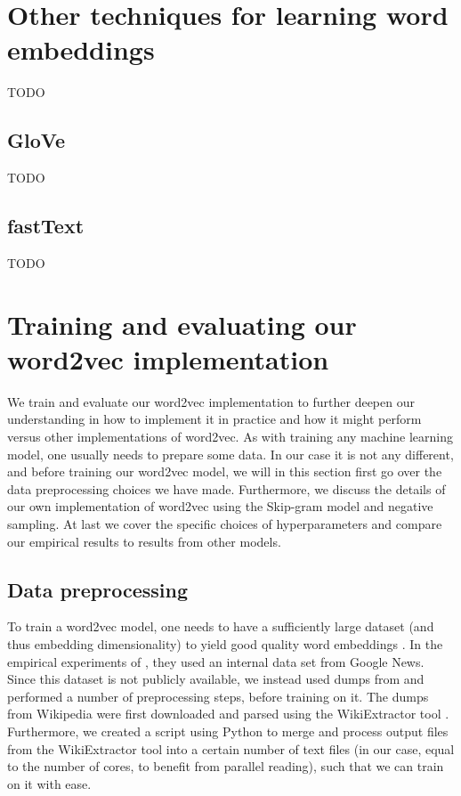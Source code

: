 \section{Other techniques for learning word embeddings}
TODO

\subsection{GloVe}
TODO

\subsection{fastText}
TODO

\section{Training and evaluating our word2vec implementation}
\label{sec:training-and-eval-our-word2vec-impl}
We train and evaluate our word2vec implementation to further deepen our understanding in how to implement it in practice and how it might perform versus other implementations of word2vec. As with training any machine learning model, one usually needs to prepare some data. In our case it is not any different, and before training our word2vec model, we will in this section first go over the data preprocessing choices we have made. Furthermore, we discuss the details of our own implementation of word2vec using the Skip-gram model and negative sampling. At last we cover the specific choices of hyperparameters and compare our empirical results to results from other models.

\subsection{Data preprocessing}
\label{sec:data-preprocessing}
To train a word2vec model, one needs to have a sufficiently large dataset (and thus embedding dimensionality) to yield good quality word embeddings \cite{mikolov2013b}. In the empirical experiments of \cite{mikolov2013b}, they used an internal data set from Google News. Since this dataset is not publicly available, we instead used dumps from \cite{WikimediaDumps} and performed a number of preprocessing steps, before training on it. The dumps from Wikipedia were first downloaded and parsed using the WikiExtractor tool \cite{Wikiextractor2015}. Furthermore, we created a script using Python \cite{python3-2009} to merge and process output files from the WikiExtractor tool into a certain number of text files (in our case, equal to the number of cores, to benefit from parallel reading), such that we can train on it with ease.

